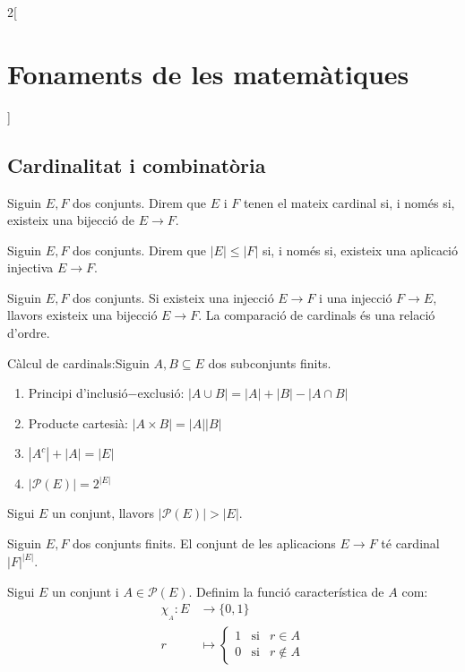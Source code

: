 \documentclass[class=article,10pt,crop=false]{standalone}
\begin{document}
\begin{multicols}{2}[\section{Fonaments de les matemàtiques}]
\subsection{Cardinalitat i combinatòria}
\begin{definition}
Siguin $E,F$ dos conjunts. Direm que $E$ i $F$ tenen el mateix cardinal si, i només si, existeix una bijecció de $E\rightarrow F$.
\end{definition}
\begin{definition}
Siguin $E,F$ dos conjunts. Direm que $|E|\leq|F|$ si, i només si, existeix una aplicació injectiva $E\rightarrow F$.
\end{definition}
\begin{theorem}
Siguin $E,F$ dos conjunts. Si existeix una injecció $E\rightarrow F$ i una injecció $F\rightarrow E$, llavors existeix una bijecció $E\rightarrow F$. La comparació de cardinals és una relació d'ordre.
\end{theorem}
\begin{prop}
Càlcul de cardinals:\newline Siguin $A,B\subseteq E$ dos subconjunts finits.
\begin{enumerate}
    \item Principi d'inclusió$-$exclusió: $|A\cup B|=|A|+|B|-|A\cap B|$
    \item Producte cartesià: $|A\times B|=|A||B|$
    \item $|A^c|+|A|=|E|$
    \item $|\mathcal{P}(E)|=2^{|E|}$
\end{enumerate}
\end{prop}
\begin{theorem}
Sigui $E$ un conjunt, llavors $|\mathcal{P}(E)|>|E|$.
\end{theorem}
\begin{prop}
Siguin $E,F$ dos conjunts finits. El conjunt de les aplicacions $E\rightarrow F$ té cardinal $|F|^{|E|}$.
\end{prop}
\begin{definition}
Sigui $E$ un conjunt i $A\in \mathcal{P}(E)$. Definim la funció característica de $A$ com: 
\begin{align*}
    \chi_{\!_A}:E&\rightarrow\{0,1\}\\
    r&\mapsto \left\{
    \begin{array}{rcl}
    1 & \text{si} & r\in A \\
    0 & \text{si} & r\notin A
    \end{array}\right.

\end{align*}
\end{definition}
\end{multicols}
\end{document}

